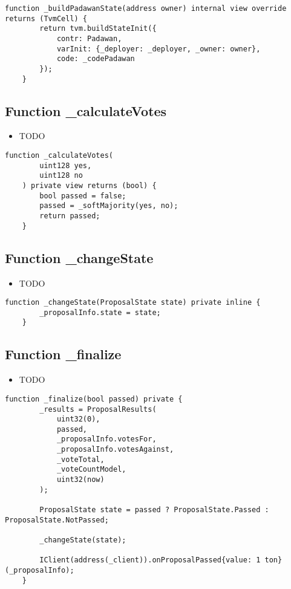 \begin{lstlisting}[firstnumber=183]
    function _buildPadawanState(address owner) internal view override returns (TvmCell) {
        return tvm.buildStateInit({
            contr: Padawan,
            varInit: {_deployer: _deployer, _owner: owner},
            code: _codePadawan
        });
    }
\end{lstlisting}

\subsection{Function \_{}calculateVotes}

\begin{itemize}
\item TODO
\end{itemize}

\begin{lstlisting}[firstnumber=161]
    function _calculateVotes(
        uint128 yes,
        uint128 no
    ) private view returns (bool) {
        bool passed = false;
        passed = _softMajority(yes, no);
        return passed;
    }
\end{lstlisting}

\subsection{Function \_{}changeState}

\begin{itemize}
\item TODO
\end{itemize}

\begin{lstlisting}[firstnumber=179]
    function _changeState(ProposalState state) private inline {
        _proposalInfo.state = state;
    }
\end{lstlisting}

\subsection{Function \_{}finalize}

\begin{itemize}
\item TODO
\end{itemize}

\begin{lstlisting}[firstnumber=112]
    function _finalize(bool passed) private {
        _results = ProposalResults(
            uint32(0),
            passed,
            _proposalInfo.votesFor,
            _proposalInfo.votesAgainst,
            _voteTotal,
            _voteCountModel,
            uint32(now)
        );

        ProposalState state = passed ? ProposalState.Passed : ProposalState.NotPassed;

        _changeState(state);

        IClient(address(_client)).onProposalPassed{value: 1 ton} (_proposalInfo);
    }
\end{lstlisting}

